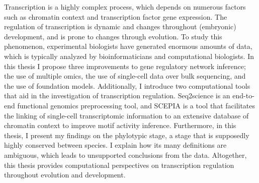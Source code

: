 Transcription is a highly complex process, which depends on numerous factors such as chromatin context and transcription factor gene expression. The regulation of transcription is dynamic and changes throughout (embryonic) development, and is prone to changes through evolution. To study this phenomenon, experimental biologists have generated enormous amounts of data, which is typically analyzed by bioinformaticians and computational biologists. In this thesis I propose three improvements to gene regulatory network inference; the use of multiple omics, the use of single-cell data over bulk sequencing, and the use of foundation models. Additionally, I introduce two computational tools that aid in the investigation of transcription regulation. Seq2science is an end-to-end functional genomics preprocessing tool, and SCEPIA is a tool that facilitates the linking of single-cell transcriptomic information to an extensive database of chromatin context to improve motif activity inference. Furthermore, in this thesis, I present my findings on the phylotypic stage, a stage that is supposedly highly conserved between species. I explain how its many definitions are ambiguous, which leads to unsupported conclusions from the data. Altogether, this thesis provides computational perspectives on transcription regulation throughout evolution and development. 
